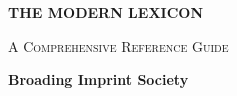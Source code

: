 \begin{titlepage}
    \thispagestyle{empty}
    \centering
    \vspace*{40mm}
    {\fontsize{28pt}{34pt}\selectfont\bfseries THE MODERN LEXICON\par}
    \vspace{5mm}
    {\fontsize{14pt}{18pt}\selectfont\scshape A Comprehensive Reference Guide\par}
    \vfill
    {\fontsize{12pt}{16pt}\selectfont\bfseries Broading Imprint Society\par}
    {\fontsize{10pt}{14pt}\par}
    \vspace*{20mm}
\end{titlepage}

